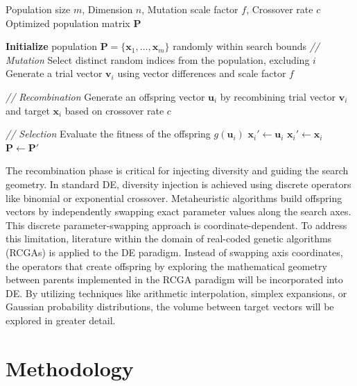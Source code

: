 \documentclass[conference]{IEEEtran}
\begin{document}
\begin{algorithm}[H]
\caption{Standard Differential Evolution}
\label{alg:canonical_de}
\begin{algorithmic}[1] 
\REQUIRE Population size $m$, Dimension $n$, Mutation scale factor $f$, Crossover rate $c$
\ENSURE Optimized population matrix $\mathbf{P}$

\STATE \textbf{Initialize} population $\mathbf{P} = \{\mathbf{x}_1, \dots, \mathbf{x}_m\}$ randomly within search bounds
        \STATE \textit{// Mutation}
        \STATE Select distinct random indices from the population, excluding $i$
        \STATE Generate a trial vector $\mathbf{v}_i$ using vector differences and scale factor $f$
        
        \STATE \textit{// Recombination}
        \STATE Generate an offspring vector $\mathbf{u}_i$ by recombining trial vector $\mathbf{v}_i$ and target $\mathbf{x}_i$ based on crossover rate $c$
        
        \STATE \textit{// Selection}
        \STATE Evaluate the fitness of the offspring $g(\mathbf{u}_i)$
            \STATE $\mathbf{x}_i' \gets \mathbf{u}_i$
        \ELSE
            \STATE $\mathbf{x}_i' \gets \mathbf{x}_i$
        \ENDIF
    \ENDFOR
    \STATE $\mathbf{P} \gets \mathbf{P}'$
\ENDWHILE
\end{algorithmic}
\end{algorithm}

The recombination phase is critical for injecting diversity and guiding the search geometry. In standard DE, diversity injection is achieved using 
discrete operators like binomial or exponential crossover. Metaheuristic algorithms build offspring vectors by independently swapping 
exact parameter values along the search axes. This discrete parameter-swapping approach is coordinate-dependent. 
To address this limitation, literature within the domain of real-coded genetic algorithms (RCGAs) is applied to the DE paradigm. 
Instead of swapping axis coordinates, the operators that create offspring by exploring 
the mathematical geometry between parents implemented in the RCGA paradigm will be incorporated into DE. By utilizing techniques like arithmetic interpolation, 
simplex expansions, or Gaussian probability distributions, the volume between target vectors will be explored in greater detail.


\section{Methodology}
\end{document}
